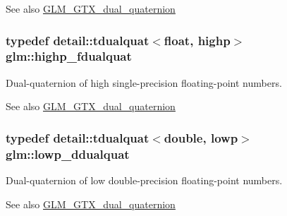 \begin{DoxySeeAlso}{See also}
\hyperlink{group__gtc__dual__quaternion}{G\+L\+M\+\_\+\+G\+T\+X\+\_\+dual\+\_\+quaternion} 
\end{DoxySeeAlso}
\subsubsection[{\texorpdfstring{highp\+\_\+fdualquat}{highp_fdualquat}}]{\setlength{\rightskip}{0pt plus 5cm}typedef detail\+::tdualquat$<$float, highp$>$ {\bf glm\+::highp\+\_\+fdualquat}}\hypertarget{group__gtc__dual__quaternion_ga2ed3283c09d3ffaf52a0e0a4b248eab6}{}\label{group__gtc__dual__quaternion_ga2ed3283c09d3ffaf52a0e0a4b248eab6}
Dual-\/quaternion of high single-\/precision floating-\/point numbers.

\begin{DoxySeeAlso}{See also}
\hyperlink{group__gtc__dual__quaternion}{G\+L\+M\+\_\+\+G\+T\+X\+\_\+dual\+\_\+quaternion} 
\end{DoxySeeAlso}
\subsubsection[{\texorpdfstring{lowp\+\_\+ddualquat}{lowp_ddualquat}}]{\setlength{\rightskip}{0pt plus 5cm}typedef detail\+::tdualquat$<$double, lowp$>$ {\bf glm\+::lowp\+\_\+ddualquat}}\hypertarget{group__gtc__dual__quaternion_ga29461fddd543ffdf65a199fc28c42458}{}\label{group__gtc__dual__quaternion_ga29461fddd543ffdf65a199fc28c42458}
Dual-\/quaternion of low double-\/precision floating-\/point numbers.

\begin{DoxySeeAlso}{See also}
\hyperlink{group__gtc__dual__quaternion}{G\+L\+M\+\_\+\+G\+T\+X\+\_\+dual\+\_\+quaternion} 
\end{DoxySeeAlso}

